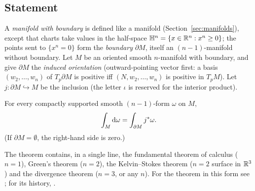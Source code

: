 \subsection{Statement}

A \emph{manifold with boundary} is defined like a manifold (Section~\ref{sec:manifolds}), except that charts take values in the half-space
$\mathbb H^n=\{x\in\mathbb{R}^n:x^n\ge0\}$; the points sent to $\{x^n=0\}$ form the \emph{boundary} $\partial M$, itself an $(n-1)$-manifold without boundary.
Let $M$ be an oriented smooth $n$-manifold with boundary, and give $\partial M$ the \emph{induced orientation} (outward-pointing vector first: a basis $(w_2,\dots,w_n)$ of $T_p\partial M$ is positive iff $(N,w_2,\dots,w_n)$ is positive in $T_pM$). Let $j:\partial M\hookrightarrow M$ be the inclusion (the letter $\iota$ is reserved for the interior product).

\begin{theorem}\label{thm:stokes}
For every compactly supported smooth $(n-1)$-form $\omega$ on $M$,
\begin{equation}\label{eq:stokes}
\int_M\dd\omega=\int_{\partial M}j\pb\omega .
\end{equation}
(If $\partial M=\emptyset$, the right-hand side is zero.)
\end{theorem}

The theorem contains, in a single line, the fundamental theorem of calculus ($n=1$), Green's theorem ($n=2$), the Kelvin--Stokes theorem ($n=2$ surface in $\mathbb{R}^3$) and the divergence theorem ($n=3$, or any $n$).
For the theorem in this form see \cite{Spivak,Lee}; for its history, \cite{Katz}.
